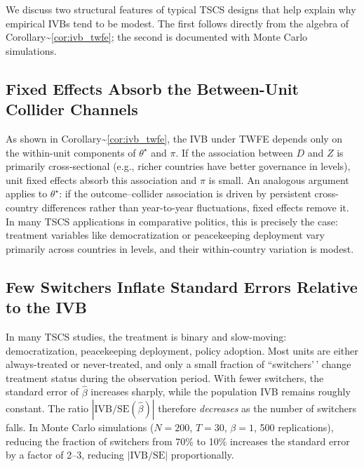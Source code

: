 \documentclass[
]{article}
\begin{document}
We discuss two structural features of typical TSCS designs that help
explain why empirical IVBs tend to be modest. The first follows directly
from the algebra of Corollary\textasciitilde{}\ref{cor:ivb_twfe}; the
second is documented with Monte Carlo simulations.

\subsection{\texorpdfstring{Fixed Effects Absorb the Between-Unit
Collider Channels
\label{sec:mech_ab}}{Fixed Effects Absorb the Between-Unit Collider Channels }}\label{fixed-effects-absorb-the-between-unit-collider-channels}

As shown in Corollary\textasciitilde{}\ref{cor:ivb_twfe}, the IVB under
TWFE depends only on the within-unit components of \(\theta^{\star}\)
and \(\pi\). If the association between \(D\) and \(Z\) is primarily
cross-sectional (e.g., richer countries have better governance in
levels), unit fixed effects absorb this association and \(\pi\) is
small. An analogous argument applies to \(\theta^{\star}\): if the
outcome--collider association is driven by persistent cross-country
differences rather than year-to-year fluctuations, fixed effects remove
it. In many TSCS applications in comparative politics, this is precisely
the case: treatment variables like democratization or peacekeeping
deployment vary primarily across countries in levels, and their
within-country variation is modest.

\subsection{\texorpdfstring{Few Switchers Inflate Standard Errors
Relative to the IVB
\label{sec:mech_c}}{Few Switchers Inflate Standard Errors Relative to the IVB }}\label{few-switchers-inflate-standard-errors-relative-to-the-ivb}

In many TSCS studies, the treatment is binary and slow-moving:
democratization, peacekeeping deployment, policy adoption. Most units
are either always-treated or never-treated, and only a small fraction of
``switchers'\,' change treatment status during the observation period.
With fewer switchers, the standard error of \(\hat\beta\) increases
sharply, while the population IVB remains roughly constant. The ratio
\(|\text{IVB}/\text{SE}(\hat\beta)|\) therefore \textit{decreases} as
the number of switchers falls. In Monte Carlo simulations (\(N = 200\),
\(T = 30\), \(\beta = 1\), 500 replications), reducing the fraction of
switchers from 70\% to 10\% increases the standard error by a factor of
2--3, reducing \(|\text{IVB}/\text{SE}|\) proportionally.
\end{document}

